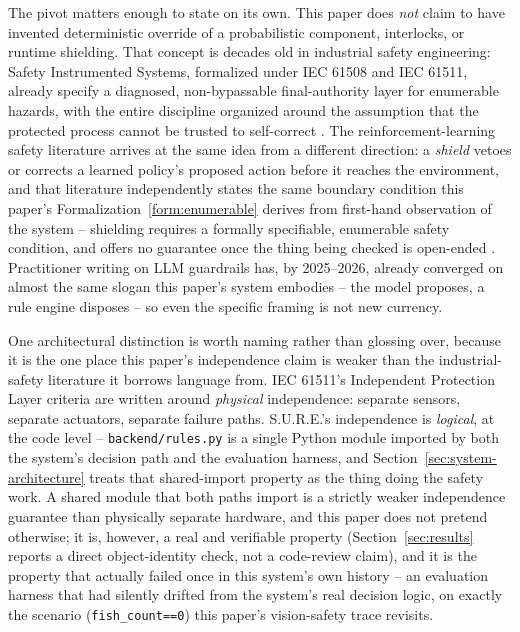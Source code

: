 The pivot matters enough to state on its own. This paper does \emph{not} claim to have invented
deterministic override of a probabilistic component, interlocks, or runtime shielding. That
concept is decades old in industrial safety engineering: Safety Instrumented Systems, formalized
under IEC 61508 and IEC 61511, already specify a diagnosed, non-bypassable final-authority layer
for enumerable hazards, with the entire discipline organized around the assumption that the
protected process cannot be trusted to self-correct \citep{aiche2009beacon,icheme2026iec61511}.
The reinforcement-learning safety literature arrives at the same idea from a different direction:
a \emph{shield} vetoes or corrects a learned policy's proposed action before it reaches the
environment, and that literature independently states the same boundary condition this paper's
Formalization~\ref{form:enumerable} derives from first-hand observation of the system -- shielding
requires a formally specifiable, enumerable safety condition, and offers no guarantee once the
thing being checked is open-ended \citep{arxiv2024verifshielding,arxiv2025watchdogs}. Practitioner
writing on LLM guardrails has, by 2025--2026, already converged on almost the same slogan this
paper's system embodies -- the model proposes, a rule engine disposes
\citep{rulebricks2026deterministic,danilec2026deterministic,arthur2025guardrails,shields2024acm} --
so even the specific framing is not new currency.

One architectural distinction is worth naming rather than glossing over, because it is the one
place this paper's independence claim is weaker than the industrial-safety literature it borrows
language from. IEC 61511's Independent Protection Layer criteria are written around \emph{physical}
independence: separate sensors, separate actuators, separate failure paths. S.U.R.E.'s
independence is \emph{logical}, at the code level -- \texttt{backend/rules.py} is a single Python
module imported by both the system's decision path and the evaluation harness, and
Section~\ref{sec:system-architecture} treats that shared-import property as the thing doing the
safety work. A shared module that both paths import is a strictly weaker independence guarantee
than physically separate hardware, and this paper does not pretend otherwise; it is, however, a
real and verifiable property (Section~\ref{sec:results} reports a direct object-identity check,
not a code-review claim), and it is the property that actually failed once in this system's own
history -- an evaluation harness that had silently drifted from the system's real decision logic, on exactly the
scenario (\texttt{fish\_count==0}) this paper's vision-safety trace revisits.

